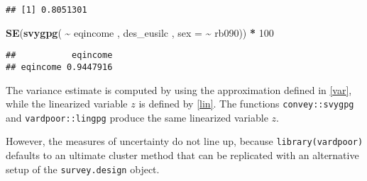 \documentclass[
]{book}
\newenvironment{Shaded}{\begin{snugshade}}{\end{snugshade}}
\newcommand{\AttributeTok}[1]{\textcolor[rgb]{0.13,0.29,0.53}{#1}}
\newcommand{\CommentTok}[1]{\textcolor[rgb]{0.56,0.35,0.01}{\textit{#1}}}
\newcommand{\DecValTok}[1]{\textcolor[rgb]{0.00,0.00,0.81}{#1}}
\newcommand{\FunctionTok}[1]{\textcolor[rgb]{0.13,0.29,0.53}{\textbf{#1}}}
\newcommand{\NormalTok}[1]{#1}
\newcommand{\SpecialCharTok}[1]{\textcolor[rgb]{0.81,0.36,0.00}{\textbf{#1}}}
\begin{document}
\begin{Shaded}
\end{Shaded}

\begin{verbatim}
## [1] 0.8051301
\end{verbatim}

\begin{Shaded}
\begin{Highlighting}[]
\FunctionTok{SE}\NormalTok{(}\FunctionTok{svygpg}\NormalTok{( }\SpecialCharTok{\textasciitilde{}}\NormalTok{ eqincome , des\_eusilc , }\AttributeTok{sex =} \SpecialCharTok{\textasciitilde{}}\NormalTok{ rb090)) }\SpecialCharTok{*} \DecValTok{100}
\end{Highlighting}
\end{Shaded}

\begin{verbatim}
##           eqincome
## eqincome 0.9447916
\end{verbatim}

The variance estimate is computed by using the approximation defined in \ref{var}, while the linearized variable \(z\) is defined by \ref{lin}. The functions \texttt{convey::svygpg} and \texttt{vardpoor::lingpg} produce the same linearized variable \(z\).

However, the measures of uncertainty do not line up, because \texttt{library(vardpoor)} defaults to an ultimate cluster method that can be replicated with an alternative setup of the \texttt{survey.design} object.
\end{document}
